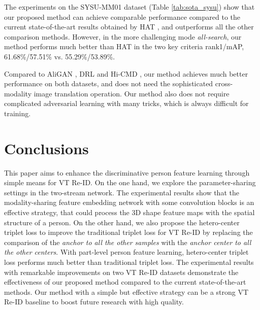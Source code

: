 \documentclass[journal]{IEEEtran}
\begin{document}
The experiments on the SYSU-MM01 dataset (Table \ref{tab:sota_sysu}) show that our proposed method can achieve comparable performance compared to the current state-of-the-art results obtained by HAT \cite{ye2018vipr}, and outperforms all the other comparison methods. However, in the more challenging mode \emph{all-search}, our method performs much better than HAT \cite{ye2018vipr} in the two key criteria rank1/mAP, 61.68\%/57.51\% vs. 55.29\%/53.89\%.

Compared to AliGAN \cite{wang2019rgb}, DRL \cite{wang2019learning1}and Hi-CMD \cite{choi2020hi}, our method achieves much better performance on both datasets, and does not need the sophisticated cross-modality image translation operation. Our method also does not require complicated adversarial learning with many tricks, which is always difficult for training.


\section{Conclusions}
This paper aims to enhance the discriminative person feature learning through simple means for VT Re-ID.
On the one hand, we explore the parameter-sharing settings in the two-stream network. The experimental results show that the modality-sharing feature embedding network with some convolution blocks is an effective strategy, that could process the 3D shape feature maps with the spatial structure of a person.
On the other hand, we also propose the hetero-center triplet loss to improve the traditional triplet loss for VT Re-ID by replacing the comparison of the \emph{anchor to all the other samples} with the \emph{anchor center to all the other centers}. With part-level person feature learning, hetero-center triplet loss performs much better than traditional triplet loss.
The experimental results with remarkable improvements on two VT Re-ID datasets demonstrate the effectiveness of our proposed method compared to the current state-of-the-art methods. Our method with a simple but effective strategy can be a strong VT Re-ID baseline to boost future research with high quality.





\end{document}
